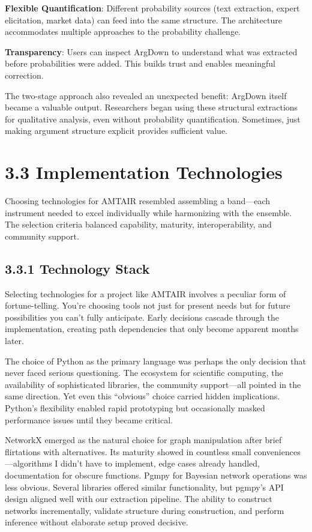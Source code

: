 \documentclass[
  11pt,
  letterpaper,
  openany]{book}
\begin{document}
\textbf{Flexible Quantification}: Different probability sources (text
extraction, expert elicitation, market data) can feed into the same
structure. The architecture accommodates multiple approaches to the
probability challenge.

\textbf{Transparency}: Users can inspect ArgDown to understand what was
extracted before probabilities were added. This builds trust and enables
meaningful correction.

The two-stage approach also revealed an unexpected benefit: ArgDown
itself became a valuable output. Researchers began using these
structural extractions for qualitative analysis, even without
probability quantification. Sometimes, just making argument structure
explicit provides sufficient value.

\section{3.3 Implementation Technologies}\label{sec-implementation-tech}

Choosing technologies for AMTAIR resembled assembling a band---each
instrument needed to excel individually while harmonizing with the
ensemble. The selection criteria balanced capability, maturity,
interoperability, and community support.

\subsection{3.3.1 Technology Stack}\label{sec-tech-stack}

Selecting technologies for a project like AMTAIR involves a peculiar
form of fortune-telling. You're choosing tools not just for present
needs but for future possibilities you can't fully anticipate. Early
decisions cascade through the implementation, creating path dependencies
that only become apparent months later.

The choice of Python as the primary language was perhaps the only
decision that never faced serious questioning. The ecosystem for
scientific computing, the availability of sophisticated libraries, the
community support---all pointed in the same direction. Yet even this
``obvious'' choice carried hidden implications. Python's flexibility
enabled rapid prototyping but occasionally masked performance issues
until they became critical.

NetworkX emerged as the natural choice for graph manipulation after
brief flirtations with alternatives. Its maturity showed in countless
small conveniences---algorithms I didn't have to implement, edge cases
already handled, documentation for obscure functions. Pgmpy for Bayesian
network operations was less obvious. Several libraries offered similar
functionality, but pgmpy's API design aligned well with our extraction
pipeline. The ability to construct networks incrementally, validate
structure during construction, and perform inference without elaborate
setup proved decisive.
\end{document}
